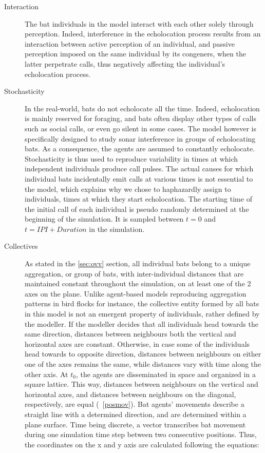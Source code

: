 \documentclass[12pt]{article}
\begin{document}
\begin{description}
\item [Interaction] The bat individuals in the model interact with each other solely through perception. Indeed, interference in the echolocation process results from an interaction between active perception of an individual, and passive perception imposed on the same individual by its congeners, when the latter perpetrate calls, thus negatively affecting the individual's echolocation process.

\item [Stochasticity] In the real-world, bats do not echolocate all the time. Indeed, echolocation is mainly reserved for foraging, and bats often display other types of calls such as social calls, or even go silent in some cases. The model however is specifically designed to study sonar interference in groups of echolocating bats. As a consequence, the agents are assumed to constantly echolocate. Stochasticity is thus used to reproduce variability in times at which independent individuals produce call pulses. The actual causes for which individual bats incidentally emit calls at various times is not essential to the model, which explains why we chose to haphazardly assign to individuals, times at which they start echolocation. The starting time of the initial call of each individual is pseudo randomly determined at the beginning of the simulation. It is sampled between $t=0$ and $t=IPI + Duration$ in the simulation. 

\item [Collectives] As stated in the \ref{sec:ovv} section, all individual bats belong to a unique aggregation, or group of bats, with inter-individual distances that are maintained constant throughout the simulation, on at least one of the 2 axes on the plane. Unlike agent-based models reproducing aggregation patterns in bird flocks for instance, the collective entity formed by all bats in this model is not an emergent property of individuals, rather defined by the modeller. If the modeller decides that all individuals head towards the same direction, distances between neighbours both the vertical and horizontal axes are constant. Otherwise, in case some of the individuals head towards to opposite direction, distances between neighbours on either one of the axes remains the same, while distances vary with time along the other axis. At $t_0$, the agents are disseminated in space and organized in a square lattice. This way, distances between neighbours on the vertical and horizontal axes, and distances between neighbours on the diagonal, respectively, are equal (~\ref{posmov}). Bat agents' movements describe a straight line with a determined direction, and are determined within a plane surface. Time being discrete, a vector transcribes bat movement during one simulation time step between two consecutive positions. Thus, the coordinates on the x and y axis are calculated following the equations:\\


\end{description}
\end{document}
